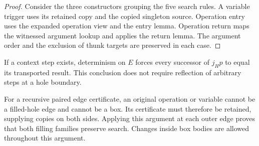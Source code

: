 \begin{proof}
Consider the three constructors grouping the five search rules. A variable
trigger uses its retained copy and the copied singleton source. Operation entry
uses the expanded operation view and the entry lemma. Operation return maps the
witnessed argument lookup and applies the return lemma. The argument order and
the exclusion of thunk targets are preserved in each case.
\end{proof}
If a context step exists, determinism on $E$ forces every successor of $j_Hp$
to equal its transported result. This conclusion does not require reflection
of arbitrary steps at a hole boundary.

For a recursive paired edge certificate, an original operation or variable
cannot be a filled-hole edge and cannot be a box. Its certificate must therefore
be retained, supplying copies on both sides. Applying this argument at each
outer edge proves that both filling families preserve search. Changes inside
box bodies are allowed throughout this argument.

